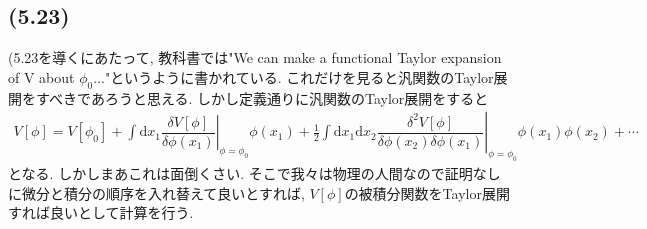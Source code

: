 \documentclass[dvipdfmx,11pt,a4paper,oneside,openany]{jsbook}
\begin{document}
\newpage
\subsection{(5.23)}
(5.23を導くにあたって, 教科書では"We can make a functional Taylor expansion of V about $\phi_0$..."というように書かれている. これだけを見ると汎関数のTaylor展開をすべきであろうと思える. しかし定義通りに汎関数のTaylor展開をすると
\begin{align*}
    V[\phi]=V[\phi_0]+\left.\int\mathrm{d}x_1\dfrac{\delta V[\phi]}{\delta \phi(x_1)}\right|_{\phi=\phi_0}\phi(x_1)+\frac{1}{2}\left.\int\mathrm{d}x_1\mathrm{d}x_2\dfrac{\delta^2V[\phi]}{\delta\phi(x_2)\delta\phi(x_1)}\right|_{\phi=\phi_0}\phi(x_1)\phi(x_2)+\cdots
\end{align*}
となる. しかしまあこれは面倒くさい. そこで我々は物理の人間なので証明なしに微分と積分の順序を入れ替えて良いとすれば, $V[\phi]$の被積分関数をTaylor展開すれば良いとして計算を行う.
\end{document}
